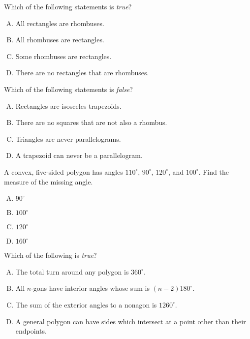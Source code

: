 \documentclass[12pt,letterpaper]{exam}
\begin{document}
\begin{questions}
\vfill



\question Which of the following statements is \textit{true}?
        \begin{enumerate}[A.]
        \item All rectangles are rhombuses.
        \item All rhombuses are rectangles.
        \item Some rhombuses are rectangles.
        \item There are no rectangles that are rhombuses. 
        \end{enumerate}



\vfill



\question Which of the following statements is \textit{false}?
        \begin{enumerate}[A.]
        \item Rectangles are isosceles trapezoids. 
        \item There are no squares that are not also a rhombus. 
        \item Triangles are never parallelograms. 
        \item A trapezoid can never be a parallelogram. 
        \end{enumerate}



\newpage



\question A convex, five-sided polygon has angles $110^\circ$, $90^\circ$, $120^\circ$, and $100^\circ$. Find the measure of the missing angle. 
        \begin{enumerate}[A.]
        \item $90^\circ$ 
        \item $100^\circ$
        \item $120^\circ$
        \item $160^\circ$
        \end{enumerate}



\vfill



\question Which of the following is \textit{true}?
        \begin{enumerate}[A.]
        \item The total turn around any polygon is $360^\circ$.
        \item All $n$-gons have interior angles whose sum is $(n - 2)180^\circ$.
        \item The sum of the exterior angles to a nonagon is $1260^\circ$.
        \item A general polygon can have sides which intersect at a point other than their endpoints. 
        \end{enumerate}




\end{questions}
\end{document}
